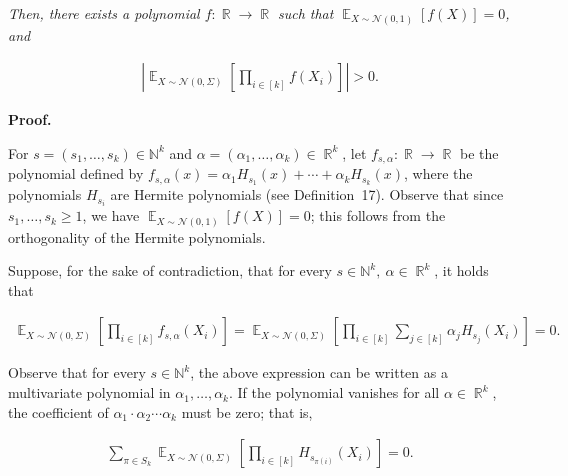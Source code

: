 \documentclass[10pt,a4paper]{article}
\begin{document}
\emph{Then, there exists a polynomial $f:\mathop{\mathbb{R}}\to\mathop{\mathbb{R}}$ such that $\mathop{\mathbb{E}}_{X\sim\mathcal{N}(0,1)}\left[f(X)\right]=0$, and}\par


\[\begin{gathered}
\left|\mathop{\mathbb{E}}_{X\sim\mathcal{N}(0,\Sigma)}\left[\prod_{i\in[k]}f(X_{i})\right]\right|>0.
\end{gathered}\]






\par\medskip\noindent\textbf{Proof.}\par




For $s=(s_{1},\dots,s_{k})\in\mathbb{N}^{k}$ and $\alpha=(\alpha_{1},\dots,\alpha_{k})\in\mathop{\mathbb{R}}^{k}$, let $f_{s,\alpha}:\mathop{\mathbb{R}}\to\mathop{\mathbb{R}}$ be the polynomial defined by $f_{s,\alpha}(x)=\alpha_{1}H_{s_{1}}(x)+\cdots+\alpha_{k}H_{s_{k}}(x)$, where the polynomials $H_{s_{i}}$ are Hermite polynomials (see Definition 17). Observe that since $s_{1},\dots,s_{k}\geqslant 1$, we have $\mathop{\mathbb{E}}_{X\sim\mathcal{N}(0,1)}\left[f(X)\right]=0$; this follows from the orthogonality of the Hermite polynomials.\par




Suppose, for the sake of contradiction, that for every $s\in\mathbb{N}^{k},\ \alpha\in\mathop{\mathbb{R}}^{k}$, it holds that\par


\[\begin{gathered}
\mathop{\mathbb{E}}_{X\sim\mathcal{N}(0,\Sigma)}\left[\prod_{i\in[k]}f_{s,\alpha}(X_{i})\right]=\mathop{\mathbb{E}}_{X\sim\mathcal{N}(0,\Sigma)}\left[\prod_{i\in[k]}\sum_{j\in[k]}\alpha_{j}H_{s_{j}}(X_{i})\right]=0.
\end{gathered}\]


Observe that for every $s\in\mathbb{N}^{k}$, the above expression can be written as a multivariate polynomial in $\alpha_{1},\dots,\alpha_{k}$.
If the polynomial vanishes for all $\alpha\in\mathop{\mathbb{R}}^{k}$, the coefficient of $\alpha_{1}\cdot\alpha_{2}\cdots\alpha_{k}$ must be zero; that is,\par


\[\begin{gathered}
\sum_{\pi\in S_{k}}\mathop{\mathbb{E}}_{X\sim\mathcal{N}(0,\Sigma)}\left[\prod_{i\in[k]}H_{s_{\pi(i)}}(X_{i})\right]=0.
\end{gathered}\]
\end{document}
